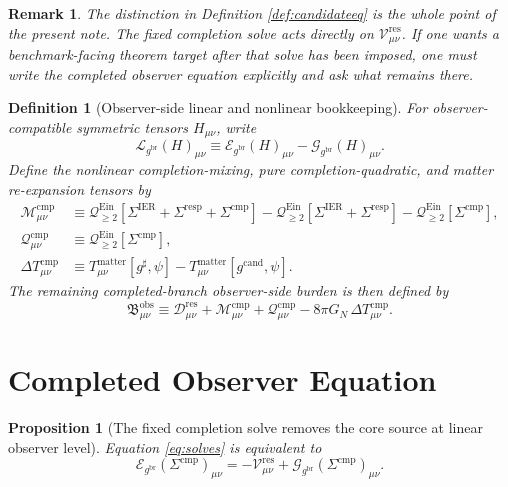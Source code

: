\documentclass[11pt]{article}
\newcommand{\ObserverMetric}{g^{\mathrm{br}}}
\newcommand{\CandidateMetric}{g^{\mathrm{cand}}}
\newcommand{\CompletedMetric}{g^{\sharp}}
\newcommand{\BaseShift}{\Sigma^{\mathrm{IER}}}
\newcommand{\ResponseShift}{\Sigma^{\mathrm{resp}}}
\newcommand{\CompShift}{\Sigma^{\mathrm{cmp}}}
\newcommand{\ResidualCore}{\mathcal V_{\mu\nu}^{\mathrm{res}}}
\newcommand{\ResidualDec}{\mathcal D_{\mu\nu}^{\mathrm{res}}}
\newcommand{\ReducedEin}{\mathcal L_{\ObserverMetric}}
\newcommand{\GaugeBook}{\mathcal G_{\ObserverMetric}}
\newcommand{\EinLin}{\mathcal E_{\ObserverMetric}}
\newcommand{\EinQuad}{\mathcal Q_{\ge 2}^{\mathrm{Ein}}}
\newcommand{\CompMix}{\mathcal M_{\mu\nu}^{\mathrm{cmp}}}
\newcommand{\CompQuad}{\mathcal Q_{\mu\nu}^{\mathrm{cmp}}}
\newcommand{\DeltaTComp}{\Delta T_{\mu\nu}^{\mathrm{cmp}}}
\newcommand{\ObsBurden}{\mathfrak B_{\mu\nu}^{\mathrm{obs}}}
\newtheorem{definition}{Definition}
\newtheorem{proposition}{Proposition}
\newtheorem{remark}{Remark}
\begin{document}
\begin{remark}
The distinction in Definition \ref{def:candidateeq} is the whole point of the present note. The fixed completion solve acts directly on \(\ResidualCore\). If one wants a benchmark-facing theorem target after that solve has been imposed, one must write the completed observer equation explicitly and ask what remains there.
\end{remark}

\begin{definition}[Observer-side linear and nonlinear bookkeeping]
\label{def:book}
For observer-compatible symmetric tensors \(H_{\mu\nu}\), write
\begin{equation}
\ReducedEin(H)_{\mu\nu}
\equiv
\EinLin(H)_{\mu\nu}-\GaugeBook(H)_{\mu\nu}.
\label{eq:redop}
\end{equation}
Define the nonlinear completion-mixing, pure completion-quadratic, and matter re-expansion tensors by
\begin{align}
\CompMix
&\equiv
\EinQuad[\BaseShift+\ResponseShift+\CompShift]
-\EinQuad[\BaseShift+\ResponseShift]
-\EinQuad[\CompShift],
\label{eq:compmix}
\\
\CompQuad
&\equiv
\EinQuad[\CompShift],
\label{eq:compquad}
\\
\DeltaTComp
&\equiv
T_{\mu\nu}^{\mathrm{matter}}[\CompletedMetric,\psi]
-T_{\mu\nu}^{\mathrm{matter}}[\CandidateMetric,\psi].
\label{eq:deltat}
\end{align}
The remaining completed-branch observer-side burden is then defined by
\begin{equation}
\ObsBurden
\equiv
\ResidualDec+\CompMix+\CompQuad-8\pi G_N\,\DeltaTComp.
\label{eq:burden}
\end{equation}
\end{definition}

\section{Completed Observer Equation}

\begin{proposition}[The fixed completion solve removes the core source at linear observer level]
\label{prop:lin}
Equation \eqref{eq:solves} is equivalent to
\begin{equation}
\EinLin(\CompShift)_{\mu\nu}
=
-\ResidualCore
+\GaugeBook(\CompShift)_{\mu\nu}.
\label{eq:linsolve}
\end{equation}
\end{proposition}
\end{document}

